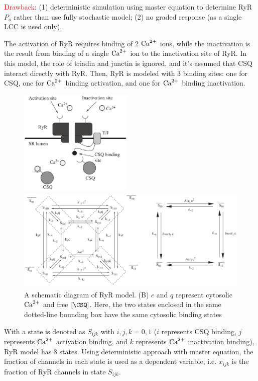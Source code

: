 \textcolor{red}{Drawback}: (1) deterministic simulation using master equation to
determine RyR $P_o$ rather than use fully stochastic model; (2) no graded response (as a
single LCC is used only).

The activation of RyR requires binding of 2 ${\text{Ca}^{2+}}$ ions, while the inactivation
is the result from binding of a single ${\text{Ca}^{2+}}$ ion to the inactivation site of
RyR. In this model, the role of triadin and junctin is ignored, and it's assumed
that CSQ interact directly with RyR. Then, RyR is modeled with 3 binding sites:
one for CSQ, one for ${\text{Ca}^{2+}}$ binding activation, and one for ${\text{Ca}^{2+}}$ binding
inactivation.

\begin{figure}[hbt]
  \centerline{\includegraphics[height=5cm]{./images/RyR_scheme_Lee2008.eps}}
    \centerline{\includegraphics[height=5cm]{./images/RyR_8state-4state_Lee2008.eps}}
    \caption{A schematic diagram of RyR model. (B) $c$ and $q$ represent cytosolic
${\text{Ca}^{2+}}$ and free $[\CSQ]$. Here, the two states enclosed in the same dotted-line
bounding box have the same cytosolic binding states}
\label{fig:RyR_scheme_Lee2008}
\end{figure}

With a state is denoted as $S_{ijk}$ with $i,j,k=0,1$ ($i$ represents CSQ
binding, $j$ represents ${\text{Ca}^{2+}}$ activation binding, and $k$ represents ${\text{Ca}^{2+}}$
inactivation binding), RyR model has 8 states. Using deterministic approach with
master equation, the fraction of channels in each state is used as a dependent
variable, i.e. $x_{ijk}$ is the fraction of RyR channels in state $S_{ijk}$.


